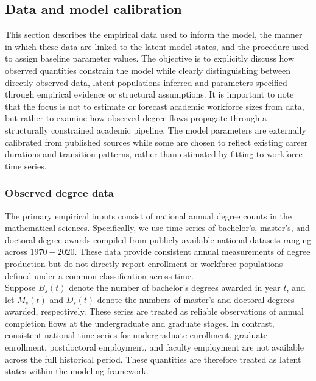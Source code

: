 \documentclass[3p]{elsarticle}%
\theoremstyle{definition}
\begin{document}
\subsection{Data and model calibration}
\noindent This section describes the empirical data used to inform the model, the manner in which these data are linked to the latent model states, and the procedure used to assign baseline parameter values. The objective is to explicitly discuss how observed quantities constrain the model while clearly distinguishing between directly observed data, latent populations inferred and parameters specified through empirical evidence or structural assumptions. It is important to note that the focus is not to estimate or forecast academic workforce sizes from data, but rather to examine how observed degree flows propagate through a structurally constrained academic pipeline. The model parameters are externally calibrated from published sources while some are chosen to reflect existing career durations and transition patterns, rather than estimated by fitting to workforce time series.


\subsubsection{Observed degree data}
\noindent The primary empirical inputs consist of national annual degree counts in the mathematical sciences. Specifically, we use time series of bachelor’s, master’s, and doctoral degree awards compiled from publicly available national datasets ranging across $1970 - 2020$. These data provide consistent annual measurements of degree production but do not directly report enrollment or workforce populations defined under a common classification across time.\\
Suppose $B_s(t)$ denote the number of bachelor’s degrees awarded in year $t$, and let $M_s(t)$ and $D_s(t)$ denote the numbers of master’s and doctoral degrees awarded, respectively. These series are treated as reliable observations of annual completion flows at the undergraduate and graduate stages. In contrast, consistent national time series for undergraduate enrollment, graduate enrollment, postdoctoral employment, and faculty employment are not available across the full historical period. These quantities are therefore treated as latent states within the modeling framework.
\end{document}
